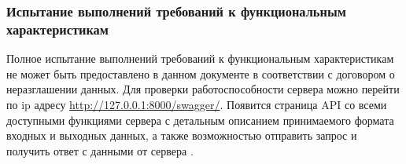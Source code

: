 \documentclass[a4paper,12pt]{article}
\begin{document}
  \subsubsection{Испытание выполнений требований к функциональным характеристикам}
  Полное испытание выполнений требований к функциональным характеристикам не может быть предоставлено в данном документе в соответствии с договором о неразглашении данных.
	Для проверки работоспособности сервера можно перейти по ip адресу \url{http://127.0.0.1:8000/swagger/}.
  Появится страница API со всеми доступными функциями сервера с детальным описанием принимаемого формата входных и выходных данных,
  а также возможностью отправить запрос и получить ответ с данными от сервера
  .






  \begin{CRTbibliography}
  \end{CRTbibliography}

  \CRTterminology

  \CRTlistRegistration
\end{document}
